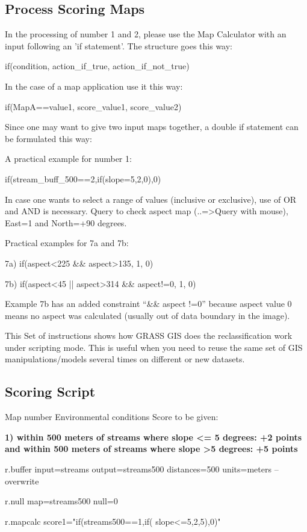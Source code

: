 \subsection{Process Scoring Maps}

In the processing of number 1 and 2, please use the Map Calculator with an input following an 'if statement'. The structure goes this
way:
\begin{smallverbatim}
if(condition, action_if_true, action_if_not_true)
\end{smallverbatim}
In the case of a map application use it this way:
\begin{smallverbatim}
if(MapA==value1, score_value1, score_value2)
\end{smallverbatim}
Since one may want to give two input maps together, a double if statement can be formulated this way:

A practical example for number 1:
\begin{smallverbatim}
if(stream_buff_500==2,if(slope=5,2,0),0)
\end{smallverbatim}
In case one wants to select a range of values (inclusive or exclusive), use of OR and AND is necessary. Query to check aspect map (..=>Query with mouse), East=1 and North=+90 degrees.

Practical examples for 7a and 7b:
\begin{smallverbatim}
7a) if(aspect<225 && aspect>135, 1, 0)

7b) if(aspect<45 || aspect>314 && aspect!=0, 1, 0)
\end{smallverbatim}
Example 7b has an added constraint ``\&\& aspect !=0'' because aspect value 0 means no aspect was calculated (usually out of data boundary in
the image).

This Set of instructions shows how GRASS GIS does the reclassification work under scripting mode. This is useful when you need to reuse the same set of GIS manipulations/models several times on different or new datasets.

\subsection{Scoring Script}

Map number Environmental conditions Score to be given:

\textbf{
1) within 500 meters of streams where slope <= 5 degrees: +2 points and within 500 meters of streams where slope >5 degrees: +5 points}
\begin{smallverbatim}
r.buffer input=streams output=streams500
 distances=500 units=meters --overwrite

r.null map=streams500 null=0

r.mapcalc score1="if(streams500==1,if(
 slope<=5,2,5),0)"
\end{smallverbatim}

